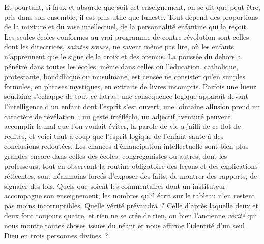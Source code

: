 \documentclass[french,twoside]{book} %
\begin{document}
Et pourtant, si faux et absurde que soit cet enseignement, on se dit que peut-être, pris dans son ensemble, il est plus utile que funeste. Tout dépend des proportions de la mixture et du vase intellectuel, de la personnalité enfantine qui la reçoit. Les seules écoles conformes au vrai programme de contre-révolution sont celles dont les directrices, \emph{saintes sœurs}, ne savent même pas lire, où les enfants n’apprennent que le signe de  la croix et des oremus. La poussée du dehors a pénétré dans toutes les écoles, même dans celles où l’éducation, catholique, protestante, bouddhique ou musulmane, est censée ne consister qu’en simples formules, en phrases mystiques, en extraits de livres incompris. Parfois une lueur soudaine s’échappe de tout ce fatras, une conséquence logique apparaît devant l’intelligence d’un enfant dont l’esprit s’est ouvert, une lointaine allusion prend un caractère de révélation ; un geste irréfléchi, un adjectif aventuré peuvent accomplir le mal que l’on voulait éviter, la parole de vie a jailli de ce flot de redites, et voici tout à coup que l’esprit logique de l’enfant saute à des conclusions redoutées. Les chances d’émancipation intellectuelle  sont bien plus grandes encore dans celles des écoles, congréganistes ou autres, dont les professeurs, tout en observant la routine obligatoire des leçons et des explications réticentes, sont néanmoins forcés d’exposer des faits, de montrer des rapports, de signaler des lois. Quels que soient les commentaires dont un instituteur accompagne son enseignement, les nombres qu’il écrit sur le tableau n’en restent pas moins incorruptibles. Quelle vérité prévaudra ? Celle d’après laquelle deux et deux font toujours quatre, et rien ne se crée de rien, ou bien l’ancienne \emph{vérité} qui nous montre toutes choses issues du néant et nous affirme l’identité d’un seul Dieu en trois personnes divines ?\par
\end{document}
